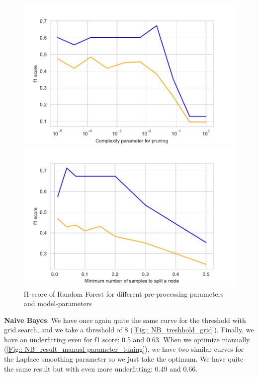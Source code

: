 \documentclass[11pt]{article}
\begin{document}
\begin{figure}[h]
\begin{minipage}[l]{0.33\textwidth}
\end{minipage}
\begin{minipage}[l]{0.33\textwidth}
\includegraphics[width=1\linewidth]{bridges/ccp_alpha_rdf.pdf}
\end{minipage}
\begin{minipage}[l]{0.33\textwidth}
\includegraphics[width=1\linewidth]{bridges/min_samples_split_rdf.pdf}
\end{minipage}
\caption{f1-score of Random Forest for different pre-processing parameters and model-parameters}
\label{Fig::RDF_result_manual parameter_tuning}
\end{figure}

\textbf{Naive Bayes}: We have once again quite the same curve for the threshold with grid search, and we take a threshold of 8 (\ref{Fig:: NB_treshhold_grid}). Finally, we have an underfitting even for f1 score: 0.5 and 0.63.
When we optimize manually (\ref{Fig:: NB_result_manual parameter_tuning}), we have two similar curves for the Laplace smoothing parameter so we just take the optimum. We have quite the same result but with even more underfitting: 0.49 and 0.66.
\end{document}
